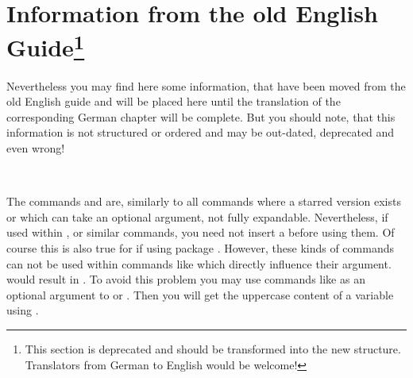 \section{Information from the old English Guide\protect\footnote{This
    section is deprecated and should be transformed into the new
    structure. Translators from German to English would be welcome!}}

Nevertheless you may find here some information, that have been moved from the
old English guide and will be placed here until the translation of the
corresponding German chapter will be complete. But you should note, that this
information is not structured or ordered and may be out-dated, deprecated and
even wrong!


\begin{Declaration}
  \\
\end{Declaration}
%
\begin{Explain}
  The commands  and  are,
  similarly to all commands where a starred version exists or which
  can take an optional argument, not fully expandable. Nevertheless,
  if used within ,
   or similar commands, you need
  not insert a  before using them.
  Of course this is also true for 
  if using package . However, these kinds of
  commands can not be used within commands like
   which directly
  influence their argument.
  would result in . To avoid this
  problem you may use commands like  as an
  optional argument to  or . Then
  you will get the uppercase content of a variable using
  .
\end{Explain}
%
%


